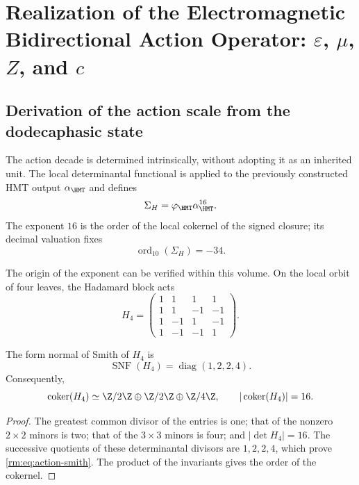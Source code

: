 \section{Realization of the Electromagnetic Bidirectional Action Operator: \(\varepsilon\), \(\mu\), \(Z\), and \(c\)}
\label{rm:ch:vacuum}

\subsection{Derivation of the action scale from the dodecaphasic state}

The action decade is determined intrinsically, without adopting it as an
inherited unit. The local determinantal functional is applied to the previously
constructed HMT output \(\alpha_{\HMT}\) and defines
\begin{equation}
\Sigma_H=\varphi_{\HMT}\alpha_{\HMT}^{16}.
\label{rm:eq:action-determinantal-reader}
\end{equation}
The exponent \(16\) is the order of the local cokernel of the signed closure; its decimal valuation fixes
\begin{equation}
\operatorname{ord}_{10}(\Sigma_H)=-34.
\label{rm:eq:action-decade}
\end{equation}

The origin of the exponent can be verified within this volume. On the
local orbit of four leaves, the Hadamard block acts
\begin{equation}
H_4=
\begin{pmatrix}
1&1&1&1\\
1&1&-1&-1\\
1&-1&1&-1\\
1&-1&-1&1
\end{pmatrix}.
\label{rm:eq:action-hadamard}
\end{equation}

\begin{lemma}
The form normal of Smith of \(H_4\) is
\begin{equation}
\operatorname{SNF}(H_4)=\operatorname{diag}(1,2,2,4).
\label{rm:eq:action-smith}
\end{equation}
Consequently,
\[
\operatorname{coker}(H_4)\simeq
\Z/2\Z\oplus\Z/2\Z\oplus\Z/4\Z,
\qquad
|\operatorname{coker}(H_4)|=16.
\]
\end{lemma}

\begin{proof}
The greatest common divisor of the entries is one; that of the nonzero
\(2\times2\) minors is two; that of the \(3\times3\) minors is four; and
\(|\det H_4|=16\). The successive quotients of these determinantal divisors
are \(1,2,2,4\), which prove \cref{rm:eq:action-smith}. The product of the
invariants gives the order of the cokernel.
\end{proof}

